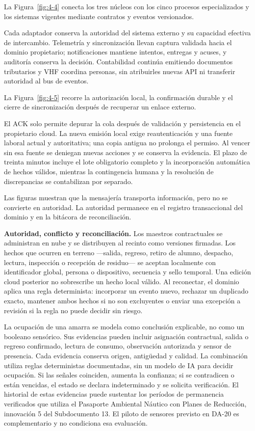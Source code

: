 La Figura~\ref{fig:4-4} conecta los tres núcleos con los cinco procesos especializados y los sistemas vigentes mediante contratos y eventos versionados.



Cada adaptador conserva la autoridad del sistema externo y su capacidad efectiva de intercambio. Telemetría y sincronización llevan captura validada hacia el dominio propietario; notificaciones mantiene intentos, entregas y acuses, y auditoría conserva la decisión. Contabilidad continúa emitiendo documentos tributarios y VHF coordina personas, sin atribuirles nuevas API ni transferir autoridad al bus de eventos.


La Figura~\ref{fig:4-5} recorre la autorización local, la confirmación durable y el cierre de sincronización después de recuperar un enlace externo.



El ACK solo permite depurar la cola después de validación y persistencia en el propietario cloud. La nueva emisión local exige reautenticación y una fuente laboral actual y autoritativa; una copia antigua no prolonga el permiso. Al vencer sin esa fuente se deniegan nuevas acciones y se conserva la evidencia. El plazo de treinta minutos incluye el lote obligatorio completo y la incorporación automática de hechos válidos, mientras la contingencia humana y la resolución de discrepancias se contabilizan por separado.


Las figuras muestran que la mensajería transporta información, pero no se convierte en autoridad. La autoridad permanece en el registro transaccional del dominio y en la bitácora de reconciliación.

\textbf{Autoridad, conflicto y reconciliación.} Los maestros contractuales se administran en nube y se distribuyen al recinto como versiones firmadas. Los hechos que ocurren en terreno —salida, regreso, retiro de alumno, despacho, lectura, inspección o recepción de residuo— se aceptan localmente con identificador global, persona o dispositivo, secuencia y sello temporal. Una edición cloud posterior no sobrescribe un hecho local válido. Al reconectar, el dominio aplica una regla determinista: incorporar un evento nuevo, rechazar un duplicado exacto, mantener ambos hechos si no son excluyentes o enviar una excepción a revisión si la regla no puede decidir sin riesgo.

La ocupación de una amarra se modela como conclusión explicable, no como un booleano sensórico. Sus evidencias pueden incluir asignación contractual, salida o regreso confirmado, lectura de consumo, observación autorizada y sensor de presencia. Cada evidencia conserva origen, antigüedad y calidad. La combinación utiliza reglas deterministas documentadas, sin un modelo de IA para decidir ocupación. Si las señales coinciden, aumenta la confianza; si se contradicen o están vencidas, el estado se declara indeterminado y se solicita verificación. El historial de estas evidencias puede sustentar los períodos de permanencia verificados que utiliza el Pasaporte Ambiental Náutico con Planes de Reducción, innovación 5 del Subdocumento 13. El piloto de sensores previsto en DA-20 es complementario y no condiciona esa evaluación.

